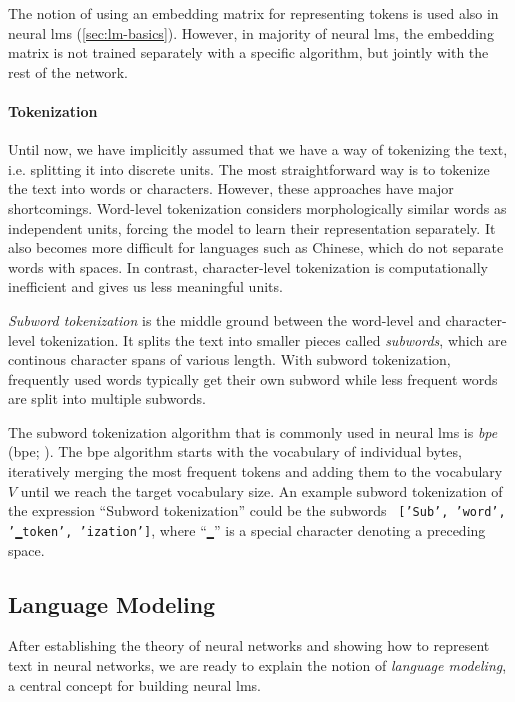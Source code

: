 {The notion of using an embedding matrix for representing tokens is used also in neural \acp{lm} (\autoref{sec:lm-basics}). However, in majority of neural \acp{lm}, the embedding matrix is not trained separately with a specific algorithm, but jointly with the rest of the network.

\paragraph{Tokenization} Until now, we have implicitly assumed that we have a way of tokenizing the text, i.e. splitting it into discrete units. The most straightforward way is to tokenize the text into words or characters. However, these approaches have major shortcomings. Word-level tokenization considers morphologically similar words as independent units, forcing the model to learn their representation separately. It also becomes more difficult for languages such as Chinese, which do not separate words with spaces. In contrast, character-level tokenization is computationally inefficient and gives us less meaningful units.

\emph{Subword tokenization}  is the middle ground between the word-level and character-level tokenization. It splits the text into smaller pieces called \emph{subwords}, which are continous character spans of various length. With subword tokenization, frequently used words typically get their own subword while less frequent words are split into multiple subwords.

The subword tokenization algorithm that is commonly used in neural \acp{lm} is \emph{\acl{bpe}} (\acs{bpe}; \citealp{sennrich2016neural}). The \ac{bpe} algorithm starts with the vocabulary of individual bytes, iteratively merging the most frequent tokens and adding them to the vocabulary $V$ until we reach the target vocabulary size. An example subword tokenization of the expression ``Subword tokenization'' could be the subwords \texttt{ ['Sub', 'word', '▁token', 'ization']}, where ``\texttt{▁}'' is a special character denoting a preceding space.


\subsection{Language Modeling}
\label{sec:lm-basics}
After establishing the theory of neural networks and showing how to represent text in neural networks, we are ready to explain the notion of \emph{language modeling}, a central concept for building neural \acp{lm}.

}
